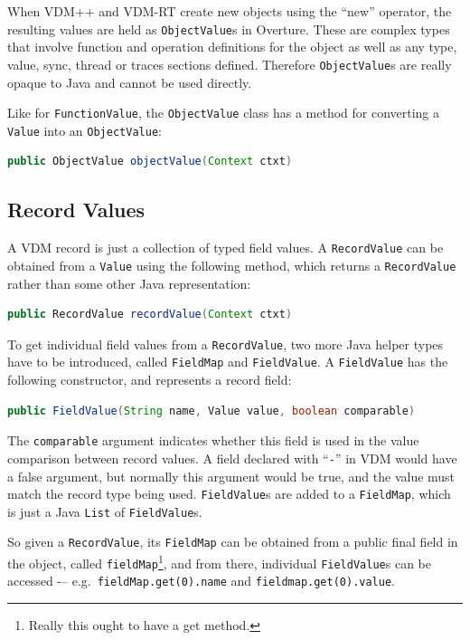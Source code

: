 \documentclass{overturerepchap}
\newcommand{\kw}[1]{{\textbf\ttfamily #1}}
\begin{document}
When VDM++ and VDM-RT create new objects using the ``\kw{new}'' operator, the resulting values are held as \texttt{ObjectValue}s in Overture. These are complex types that involve function and operation definitions for the object as well as any type, value, sync, thread or traces sections defined. Therefore \texttt{ObjectValue}s are really opaque to Java and cannot be used directly.

Like for \texttt{FunctionValue}, the \texttt{ObjectValue} class has a method for converting a \texttt{Value} into an \texttt{ObjectValue}:

\begin{lstlisting}[language=JAVA]
public ObjectValue objectValue(Context ctxt)
\end{lstlisting}

\subsection{Record Values}

A VDM record is just a collection of typed field values. A \texttt{RecordValue} can be obtained from a \texttt{Value} using the following method, which returns a \texttt{RecordValue} rather than some other Java representation:

\begin{lstlisting}[language=JAVA]
public RecordValue recordValue(Context ctxt)
\end{lstlisting}

To get individual field values from a \texttt{RecordValue}, two more Java helper types have to be introduced, called \texttt{FieldMap} and \texttt{FieldValue}. A \texttt{FieldValue} has the following constructor, and represents a record field:

\begin{lstlisting}[language=JAVA]
public FieldValue(String name, Value value, boolean comparable)
\end{lstlisting}

The \texttt{comparable} argument indicates whether this field is used in the value comparison between record values. A field declared with ``\texttt{-}'' in VDM would have a false argument, but normally this argument would be true, and the value must match the record type being used. \texttt{FieldValue}s are added to a \texttt{FieldMap}, which is just a Java \texttt{List} of \texttt{FieldValue}s.

So given a \texttt{RecordValue}, its \texttt{FieldMap} can be obtained from a public final field in the object, called \texttt{fieldMap}\footnote{Really this ought to have a get method.}, and from there, individual \texttt{FieldValue}s can be accessed -– e.g.\ \texttt{fieldMap.get(0).name} and \texttt{fieldmap.get(0).value}.
\end{document}
